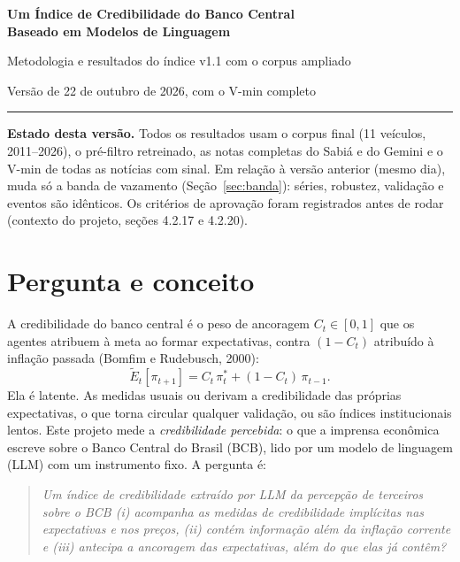 \documentclass[11pt,a4paper]{article}
\newcommand{\Et}{\widetilde{E}_t}
\begin{document}
\begin{center}
  {\LARGE\bfseries Um Índice de Credibilidade do Banco Central\\[0.15em]
  Baseado em Modelos de Linguagem\par}
  \vspace{0.8em}
  {\large Metodologia e resultados do índice v1.1 com o corpus ampliado\par}
  \vspace{1.2em}
  Versão de 22 de outubro de 2026, com o V-min completo\par
  \vspace{0.6em}
\end{center}
\hrule
\vspace{1em}

\noindent\colorbox{fundo}{\parbox{\dimexpr\textwidth-2\fboxsep}{\small
\textbf{Estado desta versão.} Todos os resultados usam o corpus final
(11 veículos, 2011--2026), o pré-filtro retreinado, as notas completas do Sabiá
e do Gemini e o V-min de todas as notícias com sinal. Em relação à versão
anterior (mesmo dia), muda só a banda de vazamento (Seção~\ref{sec:banda}):
séries, robustez, validação e eventos são idênticos. Os critérios de aprovação
foram registrados antes de rodar (contexto do projeto, seções 4.2.17 e 4.2.20).}}

\section{Pergunta e conceito}

A credibilidade do banco central é o peso de ancoragem $C_t\in[0,1]$ que os
agentes atribuem à meta ao formar expectativas, contra $(1-C_t)$ atribuído à
inflação passada (Bomfim e Rudebusch, 2000):
\begin{equation}
  \Et[\pi_{t+1}] = C_t\,\pi^*_t+(1-C_t)\,\pi_{t-1}.
\end{equation}
Ela é latente. As medidas usuais ou derivam a credibilidade das próprias
expectativas, o que torna circular qualquer validação, ou são índices
institucionais lentos. Este projeto mede a \emph{credibilidade percebida}: o
que a imprensa econômica escreve sobre o Banco Central do Brasil (BCB), lido
por um modelo de linguagem (LLM) com um instrumento fixo. A pergunta é:

\begin{quote}
\itshape Um índice de credibilidade extraído por LLM da percepção de
terceiros sobre o BCB (i) acompanha as medidas de credibilidade implícitas nas
expectativas e nos preços, (ii) contém informação além da inflação corrente e
(iii) antecipa a ancoragem das expectativas, além do que elas já contêm?
\end{quote}
\end{document}
